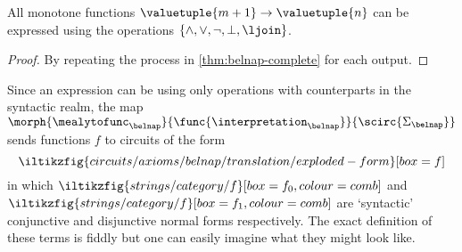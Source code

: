\begin{corollary}
    All monotone functions \(\valuetuple{m+1} \to \valuetuple{n}\) can be
    expressed using the operations \(\{\land,\lor,\neg,\bot,\ljoin\}\).
\end{corollary}
\begin{proof}
    By repeating the process in \cref{thm:belnap-complete} for each output.
\end{proof}

Since an expression can be  using only operations with counterparts in
the syntactic realm, the map \(
\morph{\mealytofunc_\belnap}{\func{\interpretation_\belnap}}{\scirc{\Sigma_\belnap}}
\) sends functions \(f\) to circuits of the form \[
    \iltikzfig{circuits/axioms/belnap/translation/exploded-form}[box=f]
\] in which \(
\iltikzfig{strings/category/f}[box=f_0,colour=comb]
\) and \(
\iltikzfig{strings/category/f}[box=f_1,colour=comb]
\) are `syntactic' conjunctive and disjunctive normal forms respectively.
The exact definition of these terms is fiddly but one can easily imagine what
they might look like.

